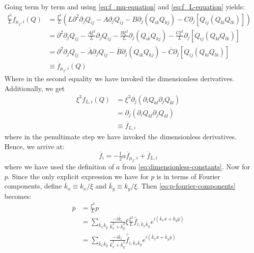 \documentclass[reqno]{article}
\begin{document}
	Going term by term and using \eqref{eq:f_mu-equation} and \eqref{eq:f_L-equation} yields:
	\begin{equation}
	\begin{split}
		\frac{\xi^3}{L} f_{\mu_2, i} (Q) 
		&= \frac{\xi^3}{L} \left(
		L \partial^2 \partial_j Q_{ij} 
		- A \partial_j Q_{ij}
		- B \partial_j \left( Q_{ik} Q_{kj} \right)
		- C \partial_j \left[ Q_{ij} \left( Q_{kl} Q_{lk} \right) \right]
		\right) \\
		&= \partial^2 \partial_j Q_{ij}
		- \frac{A \xi^2}{L} \partial_j Q_{ij}
		- \frac{B \xi^2}{L} \partial_j 
		\left( Q_{ik}Q_{kj} \right)
		- \frac{C \xi^2}{L} \partial_j \left[ Q_{ij} \left( Q_{kl} Q_{lk} \right) \right] \\
		&= \partial^2 \partial_j Q_{ij}
		- \overline{A} \partial_j Q_{ij}
		- \overline{B} \partial_j 
		\left( Q_{ik}Q_{kj} \right)
		- \overline{C} \partial_j \left[ Q_{ij} \left( Q_{kl} Q_{lk} \right) \right] \\
		&\equiv \overline{f}_{\mu_2, i} (Q)
	\end{split}
	\end{equation}
	Where in the second equality we have invoked the dimensionless derivatives. 
	Additionally, we get
	\begin{equation}
	\begin{split}
		\xi^3 f_{L, i} (Q) 
		&= \xi^3 \partial_j \left( 
		\partial_i Q_{kl} \partial_j Q_{kl} 
		\right) \\
		&= \partial_j \left( 
		\partial_i Q_{kl} \partial_j Q_{kl} 
		\right) \\
		&\equiv \overline{f}_{L, i}
	\end{split}
	\end{equation}
	where in the penultimate step we have invoked the dimensionless derivatives. 
	Hence, we arrive at:
	\begin{equation}
		\overline{f}_i 
		= -\tfrac12 a \overline{f}_{\mu_2, i}
		+ \overline{f}_{L, i}
	\end{equation}
	where we have used the definition of $a$ from \eqref{eq:dimensionless-constants}. 
	Now for $p$.
	Since the only explicit expression we have for $p$ is in terms of Fourier components, define $\overline{k}_x \equiv k_x/\xi$ and $\overline{k}_y \equiv k_y/\xi$. 
	Then \eqref{eq:p-fourier-components} becomes:
	\begin{equation}
	\begin{split}
		\overline{p} 
		&= \frac{\xi^2}{L} p \\
		&= \sum_{\overline{k}_x \overline{k}_y}
		\frac{-i \overline{k}_i}{\overline{k}_x^2 + \overline{k}_y^2}
		\xi \frac{\xi^2}{L} 
		\hat{f}_{i, \overline{k}_x \overline{k}_y}
		e^{i \left(\overline{k}_x \overline{x} + \overline{k}_y \overline{y} \right)} \\
		&= \sum_{\overline{k}_x \overline{k}_y}
		\frac{-i \overline{k}_i}{\overline{k}_x^2 + \overline{k}_y^2}
		\hat{\overline{f}}_{i, \overline{k}_x \overline{k}_y}
		e^{i \left(\overline{k}_x \overline{x} + \overline{k}_y \overline{y} \right)} 
	\end{split}
	\end{equation}
\end{document}
